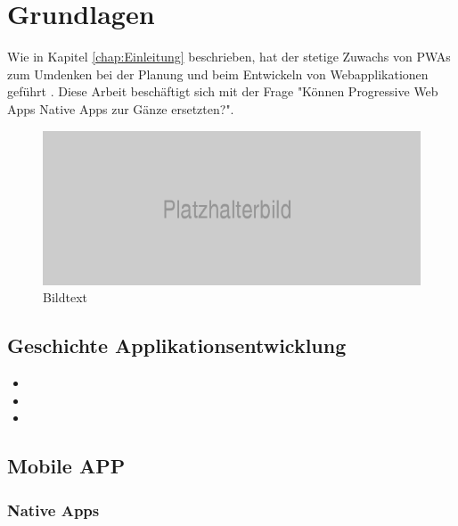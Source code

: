 \chapter{Grundlagen}
\thispagestyle{standard}
\pagestyle{standard}
\renewcommand{\footrulewidth}{0.4pt}

Wie in Kapitel \ref{chap:Einleitung} beschrieben, hat der stetige Zuwachs von \acs{PWA}s zum Umdenken bei der Planung und beim Entwickeln von Webapplikationen geführt \cite{DERs}.
Diese Arbeit beschäftigt sich mit der Frage "Können Progressive Web Apps Native Apps zur Gänze ersetzten?".
 


\begin{figure}[h]
	\centering
	\includegraphics[width=14cm]{BilderAllgemein/Platzhalter}\medskip
	\caption{Bildtext \cite{Quelle}}
	\label{fig:Übersicht des OpenNES Konzepts}
\end{figure}

 
\section{Geschichte Applikationsentwicklung}

\begin{itemize}
    \item 
	\item 
	\item 
\end{itemize}



\newpage
\section{Mobile APP}


\subsection{Native Apps}





